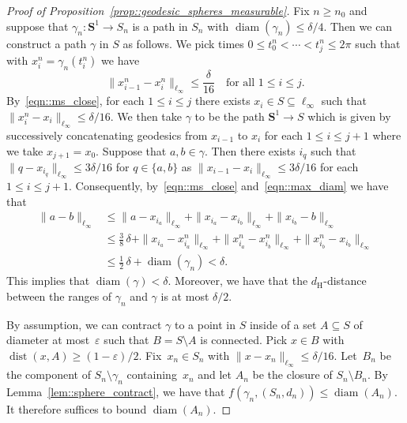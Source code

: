 \documentclass[JEP,XML,SOM,Unicode]{cedram}
\let\epsilon\varepsilon
\theoremstyle{plain}
\numberwithin{theorem}{section}
\theoremstyle{definition}
\renewcommand{\S}{{\mathbf S}}
\DeclareMathOperator{\dist}{dist}
\DeclareMathOperator{\diam}{diam}
\renewcommand{\dh}{d_{\mathrm{H}}}
\begin{document}
\begin{proof}[Proof of Proposition~\ref{prop::geodesic_spheres_measurable}]
Fix $n \geq n_0$ and suppose that $\gamma_n \colon \S^1 \to S_n$ is a path in $S_n$ with $\diam(\gamma_n) \leq \delta/4$. Then we can construct a path $\gamma$ in $S$ as follows. We pick times $0 \leq t_0^n < \cdots < t_j^n \leq 2\pi$ such that with $x_i^n = \gamma_n(t_i^n)$ we have
\begin{equation}
\label{eqn::max_diam}
\| x_{i-1}^n - x_i^n \|_{\ell_\infty} \leq \frac{\delta}{16} \quad\text{for all } 1\leq i \leq j.
\end{equation}
By~\eqref{eqn::ms_close}, for each $1 \leq i \leq j$ there exists $x_i \in S \subseteq \ell_\infty$ such that $\| x_i^n - x_i \|_{\ell_\infty} \leq \delta/16$. We then take $\gamma$ to be the path $\S^1 \to S$ which is given by successively concatenating geodesics from $x_{i-1}$ to $x_i$ for each $1 \leq i \leq j+1$ where we take $x_{j+1} = x_0$. Suppose that $a,b \in \gamma$. Then there exists $i_q$ such that $\| q - x_{i_q} \|_{\ell_\infty} \leq 3 \delta/16$ for $q \in \{a,b\}$ as $\|x_{i-1}-x_i\|_{\ell_\infty} \leq 3\delta/16$ for each $1 \leq i \leq j+1$. Consequently, by~\eqref{eqn::ms_close} and~\eqref{eqn::max_diam} we have that
\begin{align*}
\|a-b\|_{\ell_\infty}
&\leq \|a-x_{i_a}\|_{\ell_\infty} + \|x_{i_a} - x_{i_b}\|_{\ell_\infty} + \|x_{i_b} - b\|_{\ell_\infty}\\
&\leq \frac{3}{8}\,\delta + \|x_{i_a} - x_{i_a}^n\|_{\ell_\infty} + \|x_{i_a}^n - x_{i_b}^n\|_{\ell_\infty} + \|x_{i_b}^n - x_{i_b}\|_{\ell_\infty}\\
&\leq \frac{1}{2}\,\delta + \diam(\gamma_n) < \delta.
\end{align*}
This implies that $\diam(\gamma) < \delta$. Moreover, we have that the $\dh$-distance between the ranges of $\gamma_n$ and $\gamma$ is at most $\delta/2$.

By assumption, we can contract $\gamma$ to a point in $S$ inside of a set $A \subseteq S$ of diameter at most~$\epsilon$ such that $B = S \setminus A$ is connected. Pick $x \in B$ with $\dist(x,A) \geq (1-\epsilon)/2$. Fix~$x_n \in S_n$ with $\| x-x_n \|_{\ell_\infty} \leq \delta/16$. Let~$B_n$ be the component of $S_n \setminus \gamma_n$ containing~$x_n$ and let $A_n$ be the closure of $S_n \setminus B_n$. By Lemma~\ref{lem::sphere_contract}, we have that $f(\gamma_n,(S_n,d_n)) \leq \diam(A_n)$. It therefore suffices to bound $\diam(A_n)$.


\end{proof}
\end{document}
